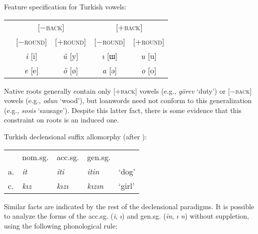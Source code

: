 \ex Feature specification for Turkish vowels: \par\nobreak
\begin{tabular}{l c c c c}
 & \multicolumn{2}{c}{[$-$\textsc{back}]} & \multicolumn{2}{c}{[$+$\textsc{back}]} \\
& [$-$\textsc{round}] & [$+$\textsc{round}] & [$-$\textsc{round}] & [$+$\textsc{round}] \\
 & \emph{i} [i]        & \emph{ü} [y]      & \emph{ı} [ɯ] & \emph{u} [u] \\
 & \emph{e} [e]        & \emph{ö} [ø]     & \emph{a} [ə]  & \emph{o} [o] \\
\end{tabular}
\xe


Native roots generally contain only [$+$\textsc{back}] vowels (e.g., \emph{görev} `duty') or [$-$\textsc{back}] vowels (e.g., \emph{odun} `wood'), but loanwords need not conform to this generalization (e.g., \emph{sosis} `sausage'). Despite this latter fact, there is some evidence that this constraint on roots is an induced one.

\ex Turkish declensional suffix allomorphy (after \citealt[][315]{Zimmer1969}): \par\nobreak
\begin{tabular}{l l l l l}
   & nom.sg.      & acc.sg.         & gen.sg.              \\
a. & \emph{it}    & \emph{iti}      & \emph{itin}      & `dog'  \\
c. & \emph{kız} & \emph{kızı}  & \emph{kızın} & `girl' \\
\end{tabular}
\xe

\noindent
Similar facts are indicated by the rest of the declensional paradigms. It is possible to analyze the forms of the acc.sg. 
(\emph{i}, \emph{ı})
and gen.sg. 
(\emph{in}, \emph{ı n})
without suppletion, using the following phonological rule: 

